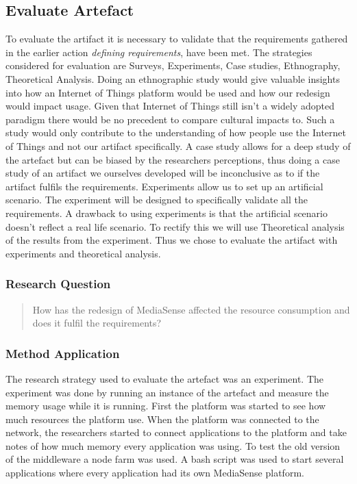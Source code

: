 \subsection{Evaluate Artefact}
To evaluate the artifact it is necessary to validate that the requirements gathered in the earlier action \emph{defining requirements}, have been met. The strategies considered for evaluation are Surveys, Experiments, Case studies, Ethnography, Theoretical Analysis. 
Doing an ethnographic study would give valuable insights into how an Internet of Things platform would be used and how our redesign would impact usage. Given that Internet of Things still isn't a widely adopted paradigm there would be no precedent to compare cultural impacts to. Such a study would only contribute to the understanding of how people use the Internet of Things and not our artifact specifically. A case study allows for a deep study of the artefact but can be biased by the researchers perceptions, thus doing a case study of an artifact we ourselves developed will be inconclusive as to if the artifact fulfils the requirements.
Experiments allow us to set up an artificial scenario. The experiment will be designed to specifically validate all the requirements. A drawback to using experiments is that the artificial scenario doesn't reflect a real life scenario. To rectify this we will use Theoretical analysis of the results from the experiment. Thus we chose to evaluate the artifact with experiments and theoretical analysis.

\subsubsection{Research Question}
\begin{quotation}
How has the redesign of MediaSense affected the resource consumption and does it fulfil the requirements?
\end{quotation}

\subsubsection{Method Application}
The research strategy used to evaluate the artefact was an experiment. The experiment was done by running an instance of the artefact and measure the memory usage while it is running. First the platform was started to see how much resources the platform use. When the platform was connected to the network, the researchers started to connect applications to the platform and take notes of how much memory every application was using. To test the old version of the middleware a node farm was used. A bash script was used to start several applications where every application had its own MediaSense platform. 

